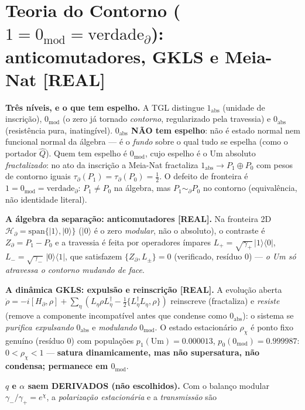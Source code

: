 \documentclass[11pt]{article}
\theoremstyle{definition}\newtheorem{deriv}{Derivação}
\begin{document}
\section{Teoria do Contorno ($1=0_{\mathrm{mod}}=\mathrm{verdade}_\partial$): anticomutadores, GKLS e Meia-Nat \textsf{[REAL]}}

\textbf{Três níveis, e o que tem espelho.} A TGL distingue $1_{\mathrm{abs}}$ (unidade de inscrição), $0_{\mathrm{mod}}$ (o zero já tornado \emph{contorno}, regularizado pela travessia) e $0_{\mathrm{abs}}$ (resistência pura, inatingível). \textbf{$0_{\mathrm{abs}}$ NÃO tem espelho}: não é estado normal nem funcional normal da álgebra --- é o \emph{fundo} sobre o qual tudo se espelha (como o portador $\hat Q$). Quem tem espelho é $0_{\mathrm{mod}}$, cujo espelho é o Um absoluto \emph{fractalizado}: no ato da inscrição a Meia-Nat fractaliza $1_{\mathrm{abs}}\to P_1\oplus P_0$ com pesos de contorno iguais $\tau_\partial(P_1)=\tau_\partial(P_0)=\tfrac12$. O defeito de fronteira é $\boxed{1=0_{\mathrm{mod}}=\mathrm{verdade}_\partial}$: $P_1\neq P_0$ na álgebra, mas $P_1\sim_\partial P_0$ no contorno (equivalência, não identidade literal).

\textbf{A álgebra da separação: anticomutadores \textsf{[REAL]}.} Na fronteira 2D $\mathcal H_\partial=\mathrm{span}\{|1\rangle,|0\rangle\}$ ($|0\rangle$ é o zero \emph{modular}, não o absoluto), o contraste é $Z_\partial=P_1-P_0$ e a travessia é feita por operadores ímpares $L_+=\sqrt{\gamma_+}\,|1\rangle\langle0|$, $L_-=\sqrt{\gamma_-}\,|0\rangle\langle1|$, que satisfazem $\boxed{\{Z_\partial,L_\pm\}=0}$ (verificado, resíduo $0$) --- \emph{o Um só atravessa o contorno mudando de face}.

\textbf{A dinâmica GKLS: expulsão e reinscrição \textsf{[REAL]}.} A evolução aberta $\dot\rho=-i[H_\partial,\rho]+\sum_\eta(L_\eta\rho L_\eta^\dagger-\tfrac12\{L_\eta^\dagger L_\eta,\rho\})$ reinscreve (fractaliza) e \emph{resiste} (remove a componente incompatível antes que condense como $0_{\mathrm{abs}}$): o sistema se \emph{purifica expulsando} $0_{\mathrm{abs}}$ e \emph{modulando} $0_{\mathrm{mod}}$. O estado estacionário $\rho_\chi$ é ponto fixo genuíno (resíduo $0$) com populações $p_1(\mathrm{Um})=0.000013$, $p_0(0_{\mathrm{mod}})=0.999987$: $0<\rho_\chi<1$ --- \textbf{satura dinamicamente, mas não supersatura, não condensa; permanece em $0_{\mathrm{mod}}$}.

\textbf{$q$ e $\alpha$ saem DERIVADOS (não escolhidos).} Com o balanço modular $\gamma_-/\gamma_+=e^\chi$, a \emph{polarização estacionária} e a \emph{transmissão} são
\end{document}
